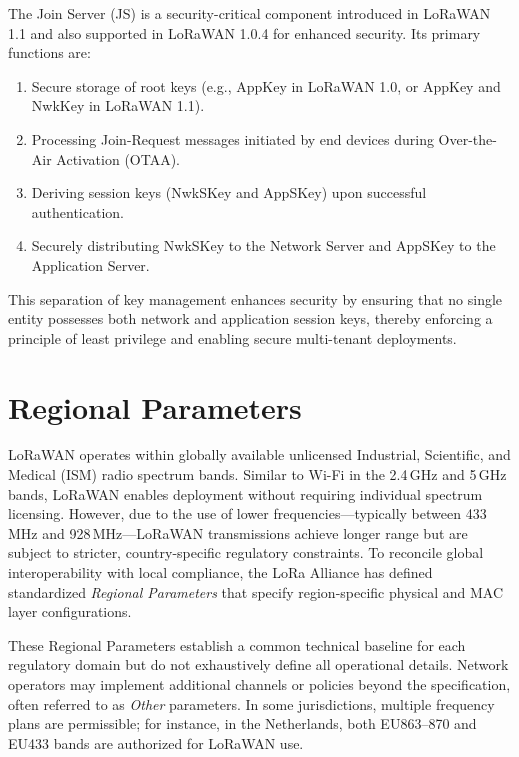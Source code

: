The Join Server (JS) is a security-critical component introduced in LoRaWAN 1.1 and also supported in LoRaWAN 1.0.4 for enhanced security. Its primary functions are:

\begin{enumerate}
    \item Secure storage of root keys (e.g., AppKey in LoRaWAN 1.0, or AppKey and NwkKey in LoRaWAN 1.1).
    \item Processing Join-Request messages initiated by end devices during Over-the-Air Activation (OTAA).
    \item Deriving session keys (NwkSKey and AppSKey) upon successful authentication.
    \item Securely distributing NwkSKey to the Network Server and AppSKey to the Application Server.
\end{enumerate}

This separation of key management enhances security by ensuring that no single entity possesses both network and application session keys, thereby enforcing a principle of least privilege and enabling secure multi-tenant deployments.


\section{Regional Parameters}

LoRaWAN operates within globally available unlicensed Industrial, Scientific, and Medical (ISM) radio spectrum bands. Similar to Wi-Fi in the 2.4\,GHz and 5\,GHz bands, LoRaWAN enables deployment without requiring individual spectrum licensing. However, due to the use of lower frequencies—typically between 433\,MHz and 928\,MHz—LoRaWAN transmissions achieve longer range but are subject to stricter, country-specific regulatory constraints. To reconcile global interoperability with local compliance, the LoRa Alliance has defined standardized \emph{Regional Parameters} that specify region-specific physical and MAC layer configurations.

These Regional Parameters establish a common technical baseline for each regulatory domain but do not exhaustively define all operational details. Network operators may implement additional channels or policies beyond the specification, often referred to as \emph{Other} parameters. In some jurisdictions, multiple frequency plans are permissible; for instance, in the Netherlands, both EU863–870 and EU433 bands are authorized for LoRaWAN use.

